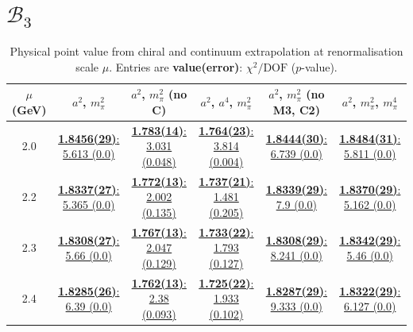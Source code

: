 \documentclass[12pt]{extarticle}
\begin{document}
\section{$\mathcal{B}_3$}
\begin{table}[h!]
\begin{center}
\begin{tabular}{|c|c|c|c|c|c|}
\hline
$\mu$ (GeV) & $a^2$, $m_\pi^2$& $a^2$, $m_\pi^2$ (no C)& $a^2$, $a^4$, $m_\pi^2$& $a^2$, $m_\pi^2$ (no M3, C2)& $a^2$, $m_\pi^2$, $m_\pi^4$\\
\hline
2.0& \hyperlink{SSmPP/NPR/a2m2_20.pdf.1}{\textbf{1.8456(29)}: 5.613 (0.0)} & \hyperlink{SSmPP/NPR/a2m2noC_20.pdf.1}{\textbf{1.783(14)}: 3.031 (0.048)} & \hyperlink{SSmPP/NPR/a2a4m2_20.pdf.1}{\textbf{1.764(23)}: 3.814 (0.004)} & \hyperlink{SSmPP/NPR/a2m2mcut_20.pdf.1}{\textbf{1.8444(30)}: 6.739 (0.0)} & \hyperlink{SSmPP/NPR/a2m2m4_20.pdf.1}{\textbf{1.8484(31)}: 5.811 (0.0)}\\
2.2& \hyperlink{SSmPP/NPR/a2m2_22.pdf.1}{\textbf{1.8337(27)}: 5.365 (0.0)} & \hyperlink{SSmPP/NPR/a2m2noC_22.pdf.1}{\textbf{1.772(13)}: 2.002 (0.135)} & \hyperlink{SSmPP/NPR/a2a4m2_22.pdf.1}{\textbf{1.737(21)}: 1.481 (0.205)} & \hyperlink{SSmPP/NPR/a2m2mcut_22.pdf.1}{\textbf{1.8339(29)}: 7.9 (0.0)} & \hyperlink{SSmPP/NPR/a2m2m4_22.pdf.1}{\textbf{1.8370(29)}: 5.162 (0.0)}\\
2.3& \hyperlink{SSmPP/NPR/a2m2_23.pdf.1}{\textbf{1.8308(27)}: 5.66 (0.0)} & \hyperlink{SSmPP/NPR/a2m2noC_23.pdf.1}{\textbf{1.767(13)}: 2.047 (0.129)} & \hyperlink{SSmPP/NPR/a2a4m2_23.pdf.1}{\textbf{1.733(22)}: 1.793 (0.127)} & \hyperlink{SSmPP/NPR/a2m2mcut_23.pdf.1}{\textbf{1.8308(29)}: 8.241 (0.0)} & \hyperlink{SSmPP/NPR/a2m2m4_23.pdf.1}{\textbf{1.8342(29)}: 5.46 (0.0)}\\
2.4& \hyperlink{SSmPP/NPR/a2m2_24.pdf.1}{\textbf{1.8285(26)}: 6.39 (0.0)} & \hyperlink{SSmPP/NPR/a2m2noC_24.pdf.1}{\textbf{1.762(13)}: 2.38 (0.093)} & \hyperlink{SSmPP/NPR/a2a4m2_24.pdf.1}{\textbf{1.725(22)}: 1.933 (0.102)} & \hyperlink{SSmPP/NPR/a2m2mcut_24.pdf.1}{\textbf{1.8287(29)}: 9.333 (0.0)} & \hyperlink{SSmPP/NPR/a2m2m4_24.pdf.1}{\textbf{1.8322(29)}: 6.127 (0.0)}\\
\hline
\end{tabular}
\caption{Physical point value from chiral and continuum extrapolation at renormalisation scale $\mu$. Entries are \textbf{value(error)}: $\chi^2/\text{DOF}$ ($p$-value).}
\end{center}
\end{table}
\end{document}
